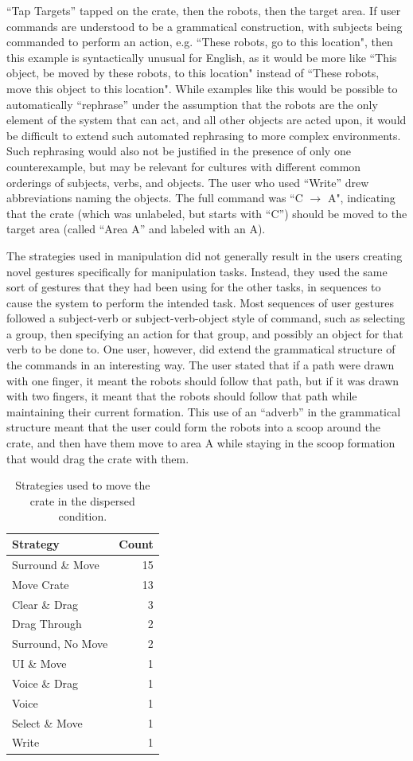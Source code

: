 ``Tap Targets'' tapped on the crate, then the robots, then the target area. 
If user commands are understood to be a grammatical construction, with subjects being commanded to perform an action, e.g. ``These robots, go to this location", then this example is syntactically unusual for English, as it would be more like ``This object, be moved by these robots, to this location" instead of ``These robots, move this object to this location". 
While examples like this would be possible to automatically ``rephrase'' under the assumption that the robots are the only element of the system that can act, and all other objects are acted upon, it would be difficult to extend such automated rephrasing to more complex environments. 
Such rephrasing would also not be justified in the presence of only one counterexample, but may be relevant for cultures with different common orderings of subjects, verbs, and objects. 
The user who used ``Write'' drew abbreviations naming the objects. The full command was ``C $\rightarrow$ A", indicating that the crate (which was unlabeled, but starts with ``C'') should be moved to the target area (called ``Area A'' and labeled with an A).

The strategies used in manipulation did not generally result in the users creating novel gestures specifically for manipulation tasks. 
Instead, they used the same sort of gestures that they had been using for the other tasks, in sequences to cause the system to perform the intended task. 
Most sequences of user gestures followed a subject-verb or subject-verb-object style of command, such as selecting a group, then specifying an action for that group, and possibly an object for that verb to be done to.
One user, however, did extend the grammatical structure of the commands in an interesting way. 
The user stated that if a path were drawn with one finger, it meant the robots should follow that path, but if it was drawn with two fingers, it meant that the robots should follow that path while maintaining their current formation. 
This use of an ``adverb'' in the grammatical structure meant that the user could form the robots into a scoop around the crate, and then have them move to area A while staying in the scoop formation that would drag the crate with them. 

\begin{table}
	\centering
	\begin{tabular}{l r}
		Strategy & Count\\
		\hline
		Surround \& Move & 15\\
		Move Crate & 13\\
		Clear \& Drag & 3\\
		Drag Through & 2\\
		Surround, No Move & 2\\
		UI \& Move & 1\\
		Voice \& Drag & 1\\
		Voice & 1\\
		Select \& Move & 1 \\
		Write & 1\\
	\end{tabular}
	\caption{Strategies used to move the crate in the dispersed condition.}
	\label{tab:dispersed_crate_strategies}
\end{table}

